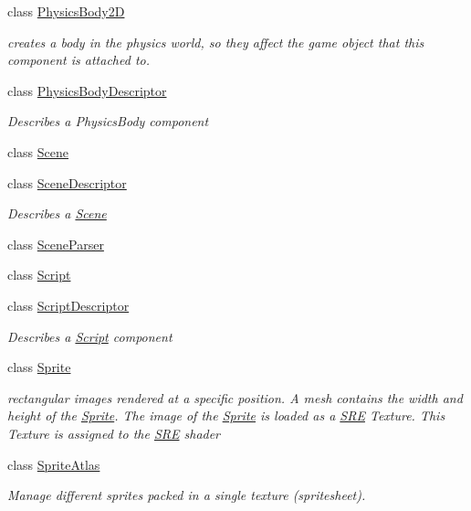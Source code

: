 \begin{DoxyCompactItemize}
class \hyperlink{class_mason_1_1_physics_body2_d}{Physics\+Body2D}
\begin{DoxyCompactList}\small\item\em creates a body in the physics world, so they affect the game object that this component is attached to. \end{DoxyCompactList}\item 
class \hyperlink{class_mason_1_1_physics_body_descriptor}{Physics\+Body\+Descriptor}
\begin{DoxyCompactList}\small\item\em Describes a Physics\+Body component ~\newline
 \end{DoxyCompactList}\item 
class \hyperlink{class_mason_1_1_scene}{Scene}
\item 
class \hyperlink{class_mason_1_1_scene_descriptor}{Scene\+Descriptor}
\begin{DoxyCompactList}\small\item\em Describes a \hyperlink{class_mason_1_1_scene}{Scene} ~\newline
 \end{DoxyCompactList}\item 
class \hyperlink{class_mason_1_1_scene_parser}{Scene\+Parser}
\item 
class \hyperlink{class_mason_1_1_script}{Script}
\item 
class \hyperlink{class_mason_1_1_script_descriptor}{Script\+Descriptor}
\begin{DoxyCompactList}\small\item\em Describes a \hyperlink{class_mason_1_1_script}{Script} component ~\newline
 \end{DoxyCompactList}\item 
class \hyperlink{class_mason_1_1_sprite}{Sprite}
\begin{DoxyCompactList}\small\item\em rectangular images rendered at a specific position. A mesh contains the width and height of the \hyperlink{class_mason_1_1_sprite}{Sprite}. The image of the \hyperlink{class_mason_1_1_sprite}{Sprite} is loaded as a \hyperlink{namespace_s_r_e}{S\+RE} Texture. This Texture is assigned to the \hyperlink{namespace_s_r_e}{S\+RE} shader \end{DoxyCompactList}\item 
class \hyperlink{class_mason_1_1_sprite_atlas}{Sprite\+Atlas}
\begin{DoxyCompactList}\small\item\em Manage different sprites packed in a single texture (spritesheet). \end{DoxyCompactList}\item 

\end{DoxyCompactItemize}
